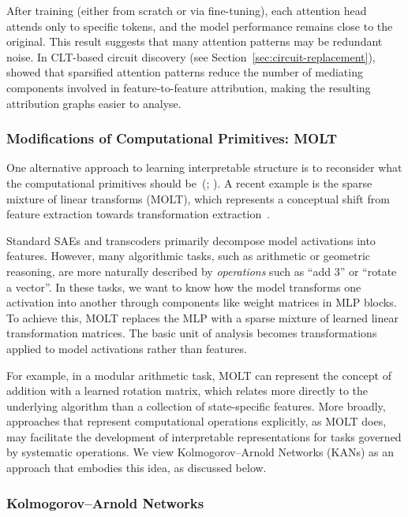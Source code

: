 After training (either from scratch or via fine-tuning), each attention head attends only to specific tokens, and the model performance remains close to the original. This result suggests that many attention patterns may be redundant noise. In CLT-based circuit discovery (see Section~\ref{sec:circuit-replacement}),  showed that sparsified attention patterns reduce the number of mediating components involved in feature-to-feature attribution, making the resulting attribution graphs easier to analyse. 

\subsubsection{Modifications of Computational Primitives: MOLT}
\label{subsubsec: molt}

One alternative approach to learning interpretable structure is to reconsider what the computational primitives should be~(; ). A recent example is the sparse mixture of linear transforms (MOLT), which represents a conceptual shift from feature extraction towards transformation extraction~.

Standard SAEs and transcoders primarily decompose model activations into features. However, many algorithmic tasks, such as arithmetic or geometric reasoning, are more naturally described by \emph{operations} such as ``add 3'' or ``rotate a vector''. In these tasks, we want to know how the model transforms one activation into another through components like weight matrices in MLP blocks. To achieve this, MOLT replaces the MLP with a sparse mixture of learned linear transformation matrices. The basic unit of analysis becomes transformations applied to model activations rather than features.

For example, in a modular arithmetic task, MOLT can represent the concept of addition with a learned rotation matrix, which relates more directly to the underlying algorithm than a collection of state-specific features. More broadly, approaches that represent computational operations explicitly, as MOLT does, may facilitate the development of interpretable representations for tasks governed by systematic operations. We view Kolmogorov--Arnold Networks (KANs) as an approach that embodies this idea, as discussed below.

\subsubsection{Kolmogorov--Arnold Networks}
\label{subsubsec: kan}

